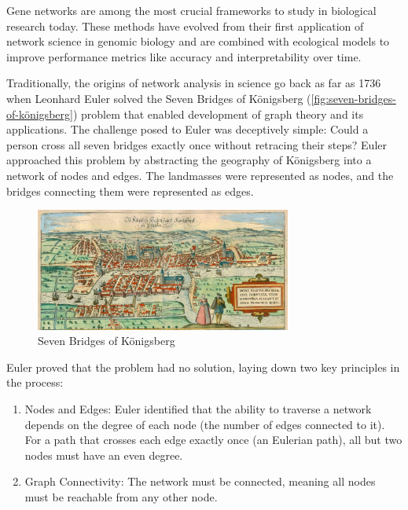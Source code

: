 Gene networks are among the most crucial frameworks to study in biological research today.
These methods have evolved from their first application of network science in genomic biology and are combined with ecological models to improve performance metrics like accuracy and interpretability over time.

Traditionally, the origins of network analysis in science go back as far as 1736 when Leonhard Euler solved the Seven Bridges of Königsberg (\autoref{fig:seven-bridges-of-königsberg}) problem that enabled development of graph theory and its applications\cite{euler_solutio_1726}.
The challenge posed to Euler was deceptively simple: Could a person cross all seven bridges exactly once without retracing their steps?
Euler approached this problem by abstracting the geography of Königsberg into a network of nodes and edges.
The landmasses were represented as nodes, and the bridges connecting them were represented as edges.
\begin{figure}[h!]
    \centering
    \includegraphics[width=0.75\textwidth]{konigsberg-1581-22} %
    \caption{Seven Bridges of Königsberg\cite{young_seven_2020}}
    \label{fig:seven-bridges-of-königsberg}
\end{figure}

\noindent Euler proved that the problem had no solution, laying down two key principles in the process:
\begin{enumerate}
    \item Nodes and Edges: Euler identified that the ability to traverse a network depends on the degree of each node (the number of edges connected to it).
    For a path that crosses each edge exactly once (an Eulerian path), all but two nodes must have an even degree.
    \item Graph Connectivity: The network must be connected, meaning all nodes must be reachable from any other node.
\end{enumerate}


